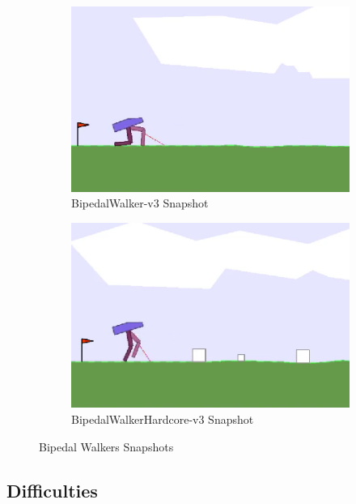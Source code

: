 \documentclass[a4paper, 12pt]{article} %
\begin{document}
\begin{figure}
	\begin{subfigure}{.5\textwidth}
		\centering
		\includegraphics[width=0.9\linewidth]{figures/bipedal/classic.png}
		\caption{BipedalWalker-v3 Snapshot~\cite{noauthor_bipedalwalker-v2_2021}}
		\label{fig:bipedal_walker_classic}
	\end{subfigure}
	\begin{subfigure}{.5\textwidth}
		\centering
		\includegraphics[width=0.9\linewidth]{figures/bipedal/hardcore.png}
		\caption{BipedalWalkerHardcore-v3 Snapshot~\cite{noauthor_bipedalwalkerhardcore-v2_2021}}
		\label{fig:bipedal_walker_hardcore}
	\end{subfigure}
	\caption{Bipedal Walkers Snapshots}
	\label{fig:bipedal_walkers}
\end{figure}

\subsection{Difficulties}
\end{document}
